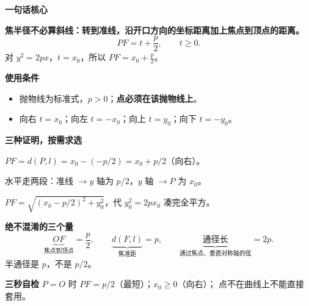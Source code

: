 \clearpage
\begin{summarybox}
  \textbf{\textcolor{CSummary}{一句话核心}}

  \textbf{焦半径不必算斜线：转到准线，沿开口方向的坐标距离加上焦点到顶点的距离。}
  \[
    \boxed{PF=t+\frac p2},\qquad t\ge0.
  \]
  对 $y^2=2px$，$t=x_0$，所以 \textbf{$PF=x_0+\frac p2$}。

  \medskip
  \textbf{\textcolor{CSummary}{使用条件}}
  \begin{itemize}[leftmargin=*, itemsep=0.35em, topsep=0.35em]
    \item 抛物线为标准式，$p>0$；\textbf{点必须在该抛物线上}。
    \item 向右 $t=x_0$；向左 $t=-x_0$；向上 $t=y_0$；向下 $t=-y_0$。
  \end{itemize}

  \medskip
  \textbf{\textcolor{CSummary}{三种证明，按需求选}}
  \begin{description}[style=nextline, leftmargin=2.8em, labelsep=0.5em, itemsep=0.35em]
    \item[\textbf{最快：}] $PF=d(P,l)=x_0-(-p/2)=x_0+p/2$（向右）。
    \item[\textbf{门槛最低：}] 水平走两段：准线 $\to y$ 轴为 $p/2$，$y$ 轴 $\to P$ 为 $x_0$。
    \item[\textbf{常规：}] $PF=\sqrt{(x_0-p/2)^2+y_0^2}$，代 $y_0^2=2px_0$ 凑完全平方。
  \end{description}

  \medskip
  \textbf{\textcolor{CSummary}{绝不混淆的三个量}}
  \[
    \underbrace{OF}_{\text{焦点到顶点}}=\frac p2,\qquad
    \underbrace{d(F,l)}_{\text{焦准距}}=p,\qquad
    \underbrace{\text{通径长}}_{\text{通过焦点、垂直对称轴的弦}}=2p.
  \]
  半通径是 $p$，不是 $p/2$。

  \medskip
  \textbf{\textcolor{CSummary}{三秒自检}}
  $P=O$ 时 $PF=p/2$（最短）；$x_0\ge0$（向右）；
  点不在曲线上不能直接套用。
\end{summarybox}
